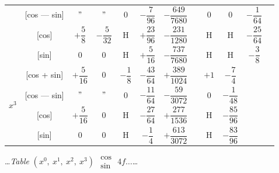\documentclass[10pt,a4paper]{article}
\newcommand{\tabletitle}[2]{%
  \begin{center}
  \ldots\textit{Table} #1 $\displaystyle\begin{smallmatrix} \cos \\ \sin \end{smallmatrix}$ #2\ldots
  \end{center}
}
\begin{document}
\begin{center}
\begin{tabular}{|c|c|c|c|c|c|c|c|c|c|c|c|}
& [cos --- sin] & $"$ & $"$ & $0$ & $-\dfrac{7}{96}$ & $-\dfrac{649}{7680}$ & & $0$ & $0$ & $-\dfrac{1}{64}$ \\
& [cos] & $+\dfrac{5}{8}$ & $-\dfrac{5}{32}$ & H & $+\dfrac{23}{96}$ & $-\dfrac{231}{1280}$ & & H & H & $-\dfrac{25}{64}$ \\
& [sin] & $0$ & $0$ & H & $+\dfrac{5}{16}$ & $-\dfrac{737}{7680}$ & & H & H & $-\dfrac{3}{8}$ \\
\hline
\multirow{4}{*}{$x^3$} & [cos + sin] & $+\dfrac{5}{16}$ & $0$ & $-\dfrac{1}{8}$ & $-\dfrac{43}{64}$ & $+\dfrac{389}{1024}$ & & $+1$ & $-\dfrac{7}{4}$ \\
& [cos --- sin] & $"$ & $"$ & $0$ & $-\dfrac{11}{64}$ & $-\dfrac{59}{3072}$ & & $0$ & $-\dfrac{1}{48}$ \\
& [cos] & $+\dfrac{5}{16}$ & $0$ & H & $-\dfrac{27}{64}$ & $+\dfrac{277}{1536}$ & & H & $-\dfrac{85}{96}$ \\
& [sin] & $0$ & $0$ & H & $-\dfrac{1}{4}$ & $+\dfrac{613}{3072}$ & & H & $-\dfrac{83}{96}$ \\
\hline
\end{tabular}
\end{center}

\vspace{1em}

\tabletitle{$(x^0,\ x^1,\ x^2,\ x^3)$}{$4f\ldots$}
\end{document}
